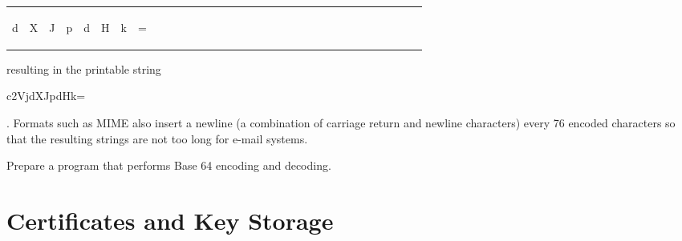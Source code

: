 \begin{center}
\begin{tabular}{cccccccc|cccccccc|cccccccc||cccccccc|cccccccc|cccccccc||cccccccc|cccccccc|cccccccc}
  \multicolumn{6}{c}{\begin{code}d\end{code}} &
  \multicolumn{6}{c}{\begin{code}X\end{code}} &
  \multicolumn{6}{c}{\begin{code}J\end{code}} &
  \multicolumn{6}{c||}{\begin{code}p\end{code}} &
  \multicolumn{6}{c}{\begin{code}d\end{code}} &
  \multicolumn{6}{c}{\begin{code}H\end{code}} &
  \multicolumn{6}{c}{\begin{code}k\end{code}} &
  \multicolumn{6}{c}{\begin{code}=\end{code}}
\end{tabular}\end{center}

\noindent
resulting in the printable string \begin{code}c2VjdXJpdHk=\end{code}.
Formats such as MIME also insert a newline (a combination of carriage return and newline characters)
every 76 encoded characters so that the resulting strings are not too long for
e-mail systems.


\begin{exercise}
Prepare a program that performs Base 64 encoding and decoding.
\end{exercise}



\section{Certificates and Key Storage}\label{Se:CertificatesKeyStorage}


